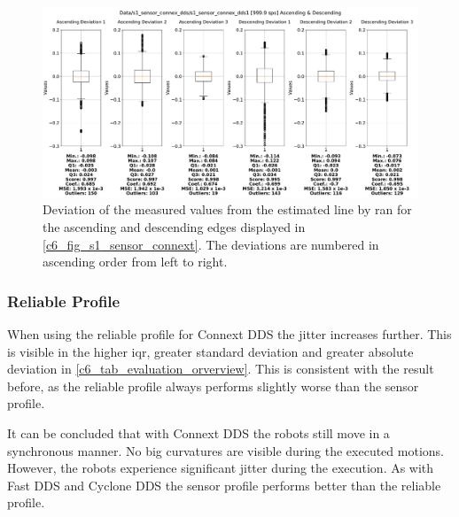 \begin{figure}[H]
	\centering
	\includegraphics[width=1\textwidth]{Figures/c6/s1/s1_sensor_connext_dds_1_box_aio.pdf}
	\caption{Deviation of the measured values from the estimated line by \gls{ran} for the ascending and descending edges displayed in \autoref{c6_fig_s1_sensor_connext}. The deviations are numbered in ascending order from left to right.}
	\label{c6_fig_s1_connext_box_aio}
\end{figure}
\subsubsection{Reliable Profile}
When using the reliable profile for Connext DDS the jitter increases further. This is visible in the higher \gls{iqr}, greater standard deviation and greater absolute deviation in \autoref{c6_tab_evaluation_orverview}. This is consistent with the result before, as the reliable profile always performs slightly worse than the sensor profile.

It can be concluded that with Connext DDS the robots still move in a synchronous manner. No big curvatures are visible during the executed motions. However, the robots experience significant jitter during the execution. As with Fast DDS and Cyclone DDS the sensor profile performs better than the reliable profile.
